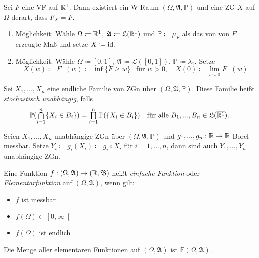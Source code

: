 \documentclass{cheat-sheet}
\newcommand{\Alg}{\mathfrak{A}} %
\newcommand{\LebAlg}{\mathfrak{L}} %
\renewcommand{\P}{\mathbb{P}} %
\newcommand{\E}{\mathbb{E}} %
\newcommand{\Bor}{\mathfrak{B}} %
\newcommand{\Leb}{\mathcal{L}} %
\renewcommand{\ER}{\overline{\R^1}} %
\begin{document}
\begin{satz}
  Sei $F$ eine VF auf $\mathbb{R}^1$. Dann existiert ein W-Raum $(\Omega, \Alg, \P)$ und eine ZG $X$ auf $\Omega$ derart, dass $F_X = F$.
\end{satz}

\begin{beweis}
  \begin{enumerate}
    \item Möglichkeit: Wähle $\Omega \coloneqq \mathbb{R}^1$, $\Alg \coloneqq \LebAlg(\R^1)$ und $\P \coloneqq \mu_F$ als das von von $F$ erzeugte Maß und setze $X \coloneqq \mathrm{id}$.
    \item Möglichkeit: Wähle $\Omega \coloneqq [0,1]$, $\Alg \coloneqq \Leb([0,1])$, $\P \coloneqq \lambda_1$. Setze
    \[
      X(w) \coloneqq F^{-}(w) \coloneqq \inf \{ F \geq w \} \enspace \text{ für } w > 0, \quad
      X(0) \coloneqq \lim_{w \downarrow 0} F^{-}(w)
    \]
  \end{enumerate}
\end{beweis}




\begin{defn}
  Sei $X_1, ..., X_n$ eine endliche Familie von ZGn über $(\Omega, \Alg, \P)$. Diese Familie heißt \emph{stochastisch unabhängig}, falls
  \[ \P(\bigcap_{i=1}^n \{ X_i \in B_i \}) = \prod_{i=1}^n \P(\{ X_i \in B_i \}) \quad \text{für alle $B_1, ..., B_n \in \LebAlg(\ER)$.} \]
\end{defn}

\begin{satz}
  Seien $X_1, ..., X_n$ unabhängige ZGn über $(\Omega, \Alg, \P)$ und $g_1, ..., g_n : \mathbb{R} \to \mathbb{R}$ Borel-messbar. Setze $Y_i \coloneqq g_i(X_i) \coloneqq g_i \circ X_i$ für $i = 1, ..., n$, dann sind auch $Y_1, ..., Y_n$ unabhängige ZGn.
\end{satz}


\begin{defn}
  Eine Funktion $f : (\Omega, \Alg) \to (\R, \Bor)$ heißt \emph{einfache Funktion} oder \emph{Elementarfunktion} auf $(\Omega, \Alg)$, wenn gilt:
  \begin{multicols}{3}
    \begin{itemize}
      \item $f$ ist messbar
      \item $f(\Omega) \subset \left[0, \infty\right[$
      \item $f(\Omega)$ ist endlich
    \end{itemize}
  \end{multicols}
  Die Menge aller elementaren Funktionen auf $(\Omega, \Alg)$ ist $\E(\Omega, \Alg)$.
\end{defn}
\end{document}
